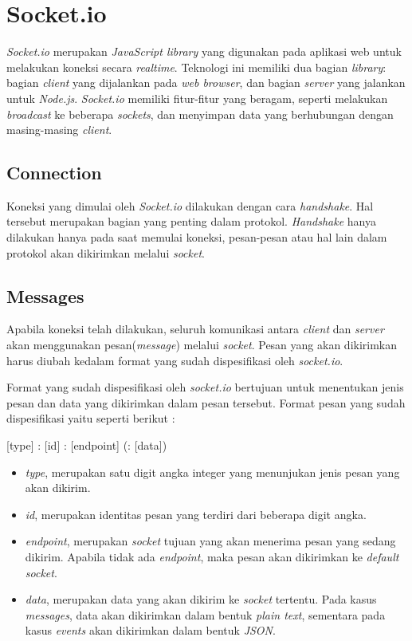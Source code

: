 \section{Socket.io}
\label{sec:Socket.io}

\textit{Socket.io} merupakan \textit{JavaScript library} yang digunakan pada aplikasi web untuk melakukan koneksi secara \textit{realtime}. Teknologi ini memiliki dua bagian \textit{library}: bagian \textit{client} yang dijalankan pada \textit{web browser}, dan bagian \textit{server} yang jalankan untuk \textit{Node.js}. \textit{Socket.io} memiliki fitur-fitur yang beragam, seperti melakukan \textit{broadcast} ke beberapa \textit{sockets}, dan menyimpan data yang berhubungan dengan masing-masing \textit{client}.

\subsection{Connection}
Koneksi yang dimulai oleh \textit{Socket.io} dilakukan dengan cara \textit{handshake}. Hal tersebut merupakan bagian yang penting dalam protokol. \textit{Handshake} hanya dilakukan hanya pada saat memulai koneksi, pesan-pesan atau hal lain dalam protokol akan dikirimkan melalui \textit{socket}. 


\subsection{Messages}
Apabila koneksi telah dilakukan, seluruh komunikasi antara \textit{client} dan \textit{server} akan menggunakan pesan(\textit{message}) melalui \textit{socket}. Pesan yang akan dikirimkan harus diubah kedalam format yang sudah dispesifikasi oleh \textit{socket.io}.

Format yang sudah dispesifikasi oleh \textit{socket.io} bertujuan untuk menentukan jenis pesan dan data yang dikirimkan dalam pesan tersebut. Format pesan yang sudah dispesifikasi yaitu seperti berikut : 

[type] : [id] : [endpoint] (: [data])

\begin{itemize}
	\item \textit{type}, merupakan satu digit angka integer yang menunjukan jenis pesan yang akan dikirim.
	\item \textit{id}, merupakan identitas pesan yang terdiri dari beberapa digit angka.
	\item \textit{endpoint}, merupakan \textit{socket} tujuan yang akan menerima pesan yang sedang dikirim. Apabila tidak ada \textit{endpoint}, maka pesan akan dikirimkan ke \textit{default socket}.
	\item \textit{data}, merupakan data yang akan dikirim ke \textit{socket} tertentu. Pada kasus \textit{messages}, data akan dikirimkan dalam bentuk \textit{plain text}, sementara pada kasus \textit{events} akan dikirimkan dalam bentuk \textit{JSON}.
\end{itemize}


